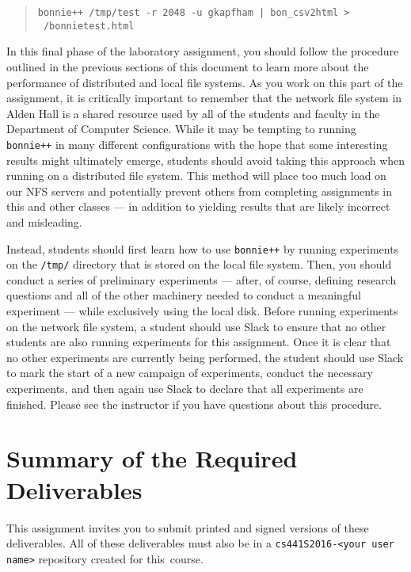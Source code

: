 \vspace*{-.1in}
\begin{quote}
  {\tt bonnie++ /tmp/test -r 2048 -u gkapfham | bon\_csv2html > ~/bonnietest.html}
\end{quote}
\vspace*{-.1in}

In this final phase of the laboratory assignment, you should follow the procedure outlined in the previous sections of
this document to learn more about the performance of distributed and local file systems. As you work on this part of the
assignment, it is critically important to remember that the network file system in Alden Hall is a shared resource used
by all of the students and faculty in the Department of Computer Science. While it may be tempting to running {\tt
bonnie++} in many different configurations with the hope that some interesting results might ultimately emerge, students
should avoid taking this approach when running on a distributed file system. This method will place too much load on our
NFS servers and potentially prevent others from completing assignments in this and other classes --- in addition to
yielding results that are likely incorrect and misleading.

Instead, students should first learn how to use {\tt bonnie++} by running experiments on the {\tt /tmp/} directory that
is stored on the local file system. Then, you should conduct a series of preliminary experiments --- after, of course,
defining research questions and all of the other machinery needed to conduct a meaningful experiment --- while
exclusively using the local disk. Before running experiments on the network file system, a student should use Slack to
ensure that no other students are also running experiments for this assignment. Once it is clear that no other
experiments are currently being performed, the student should use Slack to mark the start of a new campaign of
experiments, conduct the necessary experiments, and then again use Slack to declare that all experiments are finished.
Please see the instructor if you have questions about this procedure.

\section*{Summary of the Required Deliverables}

This assignment invites you to submit printed and signed versions of these deliverables. All of these deliverables must
also be in a {\tt cs441S2016-<your user name>} repository created for \mbox{this course}.

